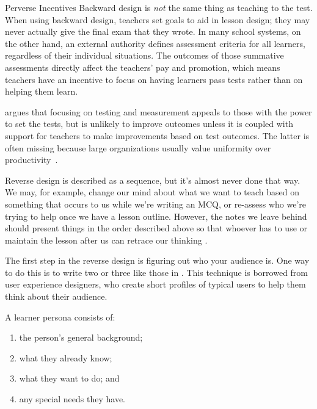\begin{aside}{Perverse Incentives}
  Backward design is \emph{not} the same thing as teaching to the test.
  When using backward design,
  teachers set goals to aid in lesson design;
  they may never actually give the final exam that they wrote.
  In many school systems,
  on the other hand,
  an external authority defines assessment criteria for all learners,
  regardless of their individual situations.
  The outcomes of those summative assessments directly affect the teachers' pay and promotion,
  which means teachers have an incentive to focus on having learners pass tests
  rather than on helping them learn.

  \cite{Gree2014} argues that focusing on testing and measurement
  appeals to those with the power to set the tests,
  but is unlikely to improve outcomes
  unless it is coupled with support for teachers to make improvements based on test outcomes.
  The latter is often missing because
  large organizations usually value uniformity over productivity~\cite{Scot1998}.
\end{aside}

Reverse design is described as a sequence,
but it's almost never done that way.
We may,
for example, change our mind about what we want to teach
based on something that occurs to us while we're writing an MCQ,
or re-assess who we're trying to help once we have a lesson outline.
However,
the notes we leave behind should present things in the order described above
so that whoever has to use or maintain the lesson after us can retrace our thinking
\cite{Parn1986}.


The first step in the reverse design is figuring out who your audience is.
One way to do this is to write two or three 
like those in .
This technique is borrowed from user experience designers,
who create short profiles of typical users
to help them think about their audience.

A learner persona consists of:

\begin{enumerate}

\item
  the person's general background;

\item
  what they already know;

\item
  what they want to do;
  and

\item
  any special needs they have.

\end{enumerate}

